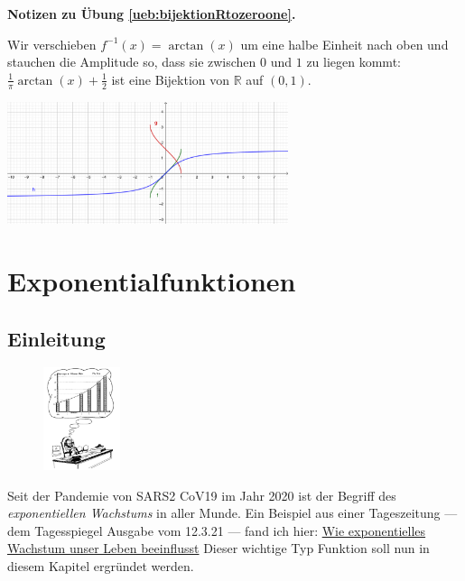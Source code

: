 \documentclass[%
11pt,%
twoside,%
titlepage,%
german,%
headsepline%
]{scrartcl}
\newcommand{\concatueb}[1]{ueb:#1}%
\newcommand{\concatlsg}[1]{lsg:#1}%
\newenvironment{lsg}[1]{%
    \par\noindent\textbf{Notizen zu Übung \ref{\concatueb{#1}}.}%
    \label{\concatlsg{#1}}
}{%
    \par%
}
\begin{document}
\begin{lsg}{bijektionRtozeroone}
Wir verschieben $f^{-1}(x)=\arctan(x)$ um eine halbe Einheit nach oben und stauchen die Amplitude so, dass sie zwischen $0$ und $1$ zu liegen kommt: $\frac{1}{\pi}\arctan(x)+\frac{1}{2}$ ist eine Bijektion von $\mathbb{R}$ auf $(0,1)$.

\begin{center}
\includegraphics[width=0.618\textwidth]{pictures/arctan.png}
\end{center}
\end{lsg}

\clearpage

\section{Exponentialfunktionen}

\subsection{Einleitung}
\begin{figure}
  \begin{center}
    \includegraphics[width=0.2\textwidth]{pictures/dagobert}
  \end{center}
\end{figure}
Seit der Pandemie von SARS2 CoV19 im Jahr 2020 ist der Begriff des \emph{exponentiellen Wachstums} in aller Munde. Ein Beispiel aus einer Tageszeitung --- dem Tagesspiegel Ausgabe vom 12.3.21 --- fand ich hier:
    \href{https://www.tagesspiegel.de/wirtschaft/wie-exponentielles-wachstum-unser-leben-beeinflusst-4236517.html}{Wie exponentielles Wachstum unser Leben beeinflusst}
Dieser wichtige Typ Funktion soll nun in diesem Kapitel ergründet werden.
\end{document}
